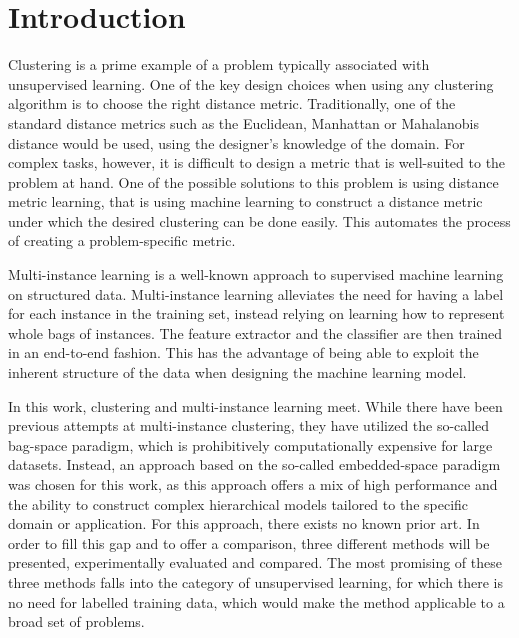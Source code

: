 \chapter*{Introduction}

Clustering is a prime example of a problem typically associated with unsupervised learning. One of the key design choices when using any clustering algorithm is to choose the right distance metric. Traditionally, one of the standard distance metrics such as the Euclidean, Manhattan or Mahalanobis distance would be used, using the designer's knowledge of the domain. For complex tasks, however, it is difficult to design a metric that is well-suited to the problem at hand. One of the possible solutions to this problem is using distance metric learning, that is using machine learning to construct a distance metric under which the desired clustering can be done easily. This automates the process of creating a problem-specific metric.

Multi-instance learning is a well-known approach to supervised machine learning on structured data. Multi-instance learning alleviates the need for having a label for each instance in the training set, instead relying on learning how to represent whole bags of instances. The feature extractor and the classifier are then trained in an end-to-end fashion. This has the advantage of being able to exploit the inherent structure of the data when designing the machine learning model.

In this work, clustering and multi-instance learning meet. While there have been previous attempts at multi-instance clustering, they have utilized the so-called bag-space paradigm, which is prohibitively computationally expensive for large datasets. Instead, an approach based on the so-called embedded-space paradigm was chosen for this work, as this approach offers a mix of high performance and the ability to construct complex hierarchical models tailored to the specific domain or application. For this approach, there exists no known prior art. In order to fill this gap and to offer a comparison, three different methods will be presented, experimentally evaluated and compared. The most promising of these three methods falls into the category of unsupervised learning, for which there is no need for labelled training data, which would make the method applicable to a broad set of problems.

